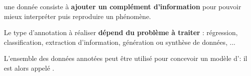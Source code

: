 	\begin{leftBarSummary}
		\begin{todolist}
			\item[\itemok]  une donnée consiste à \textbf{ajouter un complément d'information} pour pouvoir mieux interpréter puis reproduire un phénomène.
			\item[\itemok] Le type d'annotation à réaliser \textbf{dépend du problème à traiter} : régression, classification, extraction d'information, génération ou synthèse de données, ...
			\item[\itemok] L'ensemble des données annotées peut être utilisé pour concevoir un modèle d': il est alors appelé .
		\end{todolist}
	\end{leftBarSummary}